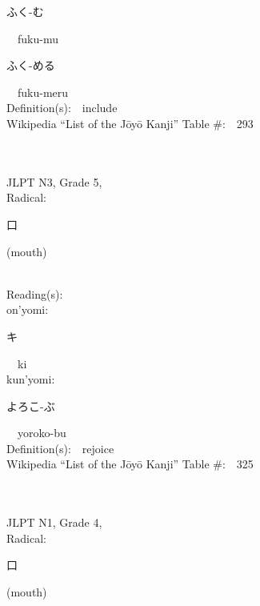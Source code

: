 \begin{multicols}{2}
{\hspace*{2em}}{\begin{CJK}{UTF8}{min} ふく-む \end{CJK}}\ \ fuku-mu\ \ \\
{\hspace*{2em}}{\begin{CJK}{UTF8}{min} ふく-める \end{CJK}}\ \ fuku-meru\ \ \\
Definition(s):\ \ include \\
Wikipedia ``List of the J\=oy\=o Kanji'' Table \#:\ \ 293 \\
\ \ \\
{\fontsize{34pt}{40pt}  }\ \ \\  %
{JLPT N3, Grade 5, \\Radical:\ \ {\begin{CJK}{UTF8}{min} 口 \end{CJK}} (mouth) } \\
Reading(s):\ \ \\
{\hspace*{1em}}on'yomi:\ \ \\
{\hspace*{2em}}{\begin{CJK}{UTF8}{min} キ \end{CJK}}\ \ ki\ \ \\
{\hspace*{1em}}kun'yomi:\ \ \\
{\hspace*{2em}}{\begin{CJK}{UTF8}{min} よろこ-ぶ \end{CJK}}\ \ yoroko-bu\ \ \\
Definition(s):\ \ rejoice \\
Wikipedia ``List of the J\=oy\=o Kanji'' Table \#:\ \ 325 \\
\ \ \\
{\fontsize{34pt}{40pt}  }\ \ \\  %
{JLPT N1, Grade 4, \\Radical:\ \ {\begin{CJK}{UTF8}{min} 口 \end{CJK}} (mouth) } \\

\end{multicols}
